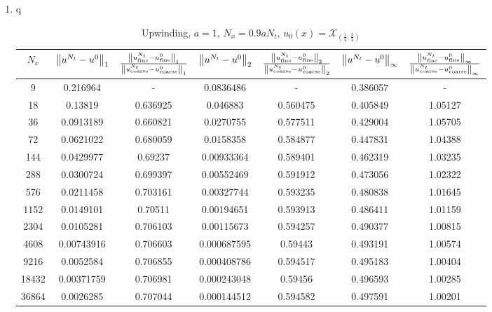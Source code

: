 \documentclass{article} %
\theoremstyle{plain}
\numberwithin{equation}{section} %
\numberwithin{figure}{section} %
\numberwithin{table}{section} %
\begin{document}
\begin{enumerate}[\ \ (a)]
    \item {\color{white}q}
        \begin{table}[ht!]
            \caption*{Upwinding, $a = 1$, $N_x = 0.9aN_t$, $u_0(x) = \mathcal{X}_{(\frac{1}{4},\frac{3}{4})}$}
            \centering
            \begin{tabular}{||c|c|c||c|c||c|c||}\hline\hline
               $N_x$ & $\norm{u^{N_t} - u^0}_1$ & $\frac{\norm{u_\text{fine}^{N_t} - u_\text{fine}^0}_1}{\norm{u_\text{coarse}^{N_t} - u_\text{coarse}^0}_1}$ & $\norm{u^{N_t} - u^0}_2$ & $\frac{\norm{u_\text{fine}^{N_t} - u_\text{fine}^0}_2}{\norm{u_\text{coarse}^{N_t} - u_\text{coarse}^0}_2}$ & $\norm{u^{N_t} - u^0}_\infty$ & $\frac{\norm{u_\text{fine}^{N_t} - u_\text{fine}^0}_\infty}{\norm{u_\text{coarse}^{N_t} - u_\text{coarse}^0}_\infty}$ \\
                \hline
                 9 & 0.216964   & -        & 0.0836486   & -        & 0.386057 & -       \\
                18 & 0.13819    & 0.636925 & 0.046883    & 0.560475 & 0.405849 & 1.05127 \\
                36 & 0.0913189  & 0.660821 & 0.0270755   & 0.577511 & 0.429004 & 1.05705 \\
                72 & 0.0621022  & 0.680059 & 0.0158358   & 0.584877 & 0.447831 & 1.04388 \\
               144 & 0.0429977  & 0.69237  & 0.00933364  & 0.589401 & 0.462319 & 1.03235 \\
               288 & 0.0300724  & 0.699397 & 0.00552469  & 0.591912 & 0.473056 & 1.02322 \\
               576 & 0.0211458  & 0.703161 & 0.00327744  & 0.593235 & 0.480838 & 1.01645 \\
              1152 & 0.0149101  & 0.70511  & 0.00194651  & 0.593913 & 0.486411 & 1.01159 \\
              2304 & 0.0105281  & 0.706103 & 0.00115673  & 0.594257 & 0.490377 & 1.00815 \\
              4608 & 0.00743916 & 0.706603 & 0.000687595 & 0.59443  & 0.493191 & 1.00574 \\
              9216 & 0.0052584  & 0.706855 & 0.000408786 & 0.594517 & 0.495183 & 1.00404 \\
             18432 & 0.00371759 & 0.706981 & 0.000243048 & 0.59456  & 0.496593 & 1.00285 \\
             36864 & 0.0026285  & 0.707044 & 0.000144512 & 0.594582 & 0.497591 & 1.00201 \\
             \hline\hline

\end{tabular}
\end{table}
\end{enumerate}
\end{document}

